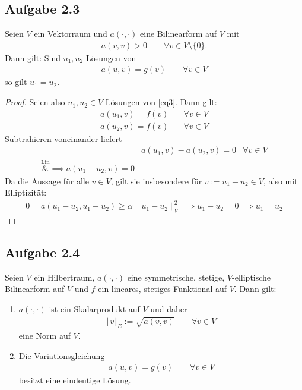 \subsection{Aufgabe 2.3}
Seien $V$ ein Vektorraum und $a(\cdot,\cdot)$ eine Bilinearform auf $V$ mit
\begin{align*}
	a(v,v)>0\qquad\forall v\in V\setminus\lbrace0\rbrace.
\end{align*}
Dann gilt: Sind $u_1,u_2$ Lösungen von
\begin{align}\label{eq3}
	a(u,v)=g(v)\qquad\forall v\in V
\end{align}
so gilt $u_1=u_2$.

\begin{proof}
	Seien also $u_1,u_2\in V$ Lösungen von \eqref{eq3}. 
	Dann gilt:
	\begin{align*}
		a(u_1,v)=f(v) \quad&\forall v\in V\\
		a(u_2,v)=f(v) \quad&\forall v\in V
	\end{align*}
	Subtrahieren voneinander liefert
	\begin{align*}
		&a(u_1,v)-a(u_2,v)=0 &\forall v\in V\\
		\overset{\text{Lin}}&{\implies}
		a(u_1-u_2,v)=0
	\end{align*}
	Da die Aussage für alle $v\in V$, gilt sie insbesondere für $v:=u_1-u_2\in V$, also mit Elliptizität:
	\begin{align*}
		0=a(u_1-u_2,u_1-u_2)\geq \alpha \|u_1-u_2\|^2_V\implies u_1-u_2=0\implies u_1=u_2
	\end{align*}
\end{proof}


\subsection{Aufgabe 2.4}
Seien $V$ ein Hilbertraum, $a(\cdot,\cdot)$ eine symmetrische, stetige, $V$-elliptische Bilinearform auf $V$ und $f$ ein lineares, stetiges Funktional auf $V$. Dann gilt:

\begin{enumerate}[label=(\alph*)]
	\item $a(\cdot,\cdot)$ ist ein Skalarprodukt auf $V$ und daher
	\begin{align*}
		\Vert v\Vert_E:=\sqrt{a(v,v)}\qquad\forall v\in V
	\end{align*}
	eine Norm auf $V$.
	\item Die Variationsgleichung
	\begin{align*}
		a(u,v)=g(v)\qquad\forall v\in V
	\end{align*}
	besitzt eine eindeutige Lösung.
\end{enumerate}

